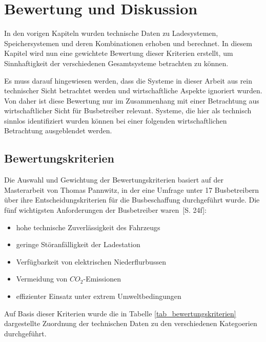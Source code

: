 \chapter{Bewertung und Diskussion} %
In den vorigen Kapiteln wurden technische Daten zu Ladesystemen, Speichersystemen und deren Kombinationen erhoben und berechnet. In diesem Kapitel wird nun eine gewichtete Bewertung dieser Kriterien erstellt, um Sinnhaftigkeit der verschiedenen Gesamtsysteme betrachten zu können.

Es muss darauf hingewiesen werden, dass die Systeme in dieser Arbeit aus rein technischer Sicht betrachtet werden und wirtschaftliche Aspekte ignoriert wurden. Von daher ist diese Bewertung nur im Zusammenhang mit einer Betrachtung aus wirtschaftlicher Sicht für Busbetreiber relevant. Systeme, die hier als technisch sinnlos identifiziert wurden können bei einer folgenden wirtschaftlichen Betrachtung ausgeblendet werden.

\section{Bewertungskriterien}
Die Auswahl und Gewichtung der Bewertungskriterien basiert auf der Masterarbeit von Thomas Pannwitz, in der eine Umfrage unter 17 Busbetreibern über ihre Entscheidungskriterien für die Busbeschaffung durchgeführt wurde. Die fünf wichtigsten Anforderungen der Busbetreiber waren~\cite{pannwitz2014}[S. 24f]:
\begin{itemize}
	\item hohe technische Zuverlässigkeit des Fahrzeugs
	\item geringe Störanfälligkeit der Ladestation
	\item Verfügbarkeit von elektrischen Niederflurbussen
	\item Vermeidung von $CO_2$-Emissionen
	\item effizienter Einsatz unter extrem Umweltbedingungen
\end{itemize}

Auf Basis dieser Kriterien wurde die in Tabelle \ref{tab_bewertungskriterien} dargestellte Zuordnung der technischen Daten zu den verschiedenen Kategoerien durchgeführt.



